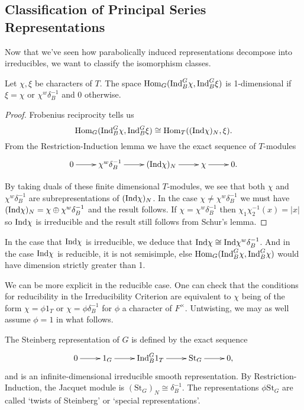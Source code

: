 \subsection{Classification of Principal Series Representations}


Now that we've seen how parabolically induced representations decompose into irreducibles, we want to classify the isomorphism classes.

\begin{prop}
    Let $\chi, \xi$ be characters of $T$. The space $\mathrm{Hom}_G(\mathrm{Ind}_B^G \chi, \mathrm{Ind}_B^G \xi)$ is 1-dimensional if $\xi = \chi$ or $\chi^w \delta_B^{-1}$ and 0 otherwise.
\end{prop}
\begin{proof}
    Frobenius reciprocity tells us
    $$\mathrm{Hom}_G(\mathrm{Ind}_B^G \chi, \mathrm{Ind}_B^G \xi) \cong \mathrm{Hom}_T((\mathrm{Ind} \chi)_N, \xi).$$
    From the Restriction-Induction lemma we have the exact sequence of $T$-modules
    $$\xymatrix{0 \ar[r] & \chi^w \delta_B^{-1} \ar[r] & (\Ind \chi)_N \ar[r] & \chi \ar[r] & 0.}$$

    By taking duals of these finite dimensional $T$-modules, we see that both $\chi$ and $\chi^w \delta_B^{-1}$ are subrepresentations of $(\mathrm{Ind} \chi)_N$. In the case $\chi \neq \chi^w \delta_B^{-1}$ we must have $(\mathrm{Ind} \chi)_N = \chi \oplus \chi^w \delta_B^{-1}$ and the result follows. If $\chi = \chi^w \delta_B^{-1}$ then $\chi_1\chi_2^{-1} (x) = |x|$ so $\mathrm{Ind} \chi$ is irreducible and the result still follows from Schur's lemma.
\end{proof}

\begin{rem}
In the case that $\mathrm{Ind} \chi$ is irreducible, we deduce that $\mathrm{Ind} \chi \cong \mathrm{Ind} \chi^w \delta_B^{-1}$. And in the case $\mathrm{Ind} \chi$ is reducible, it is not semisimple, else $\mathrm{Hom}_G(\mathrm{Ind}_B^G \chi, \mathrm{Ind}_B^G \chi)$ would have dimension strictly greater than 1.
\end{rem}

We can be more explicit in the reducible case. One can check that the conditions for reducibility in the Irreducibility Criterion are equivalent to $\chi$ being of the form $\chi = \phi 1_T$ or $\chi =\phi \delta_B^{-1}$ for $\phi$ a character of $F^\times$. Untwisting, we may as well assume $\phi=1$ in what follows.

\begin{defn}
    The Steinberg representation of $G$ is defined by the exact sequence
    $$\xymatrix{0 \ar[r] & 1_G \ar[r] & \Ind_B^G 1_T \ar[r] & \mathrm{St}_G \ar[r] & 0,}$$ and is an infinite-dimensional irreducible smooth representation. By Restriction-Induction, the Jacquet module is $(\mathrm{St}_G)_N \cong \delta_B^{-1}$. The representations $\phi \mathrm{St}_G$ are called `twists of Steinberg' or `special representations'.
\end{defn}

